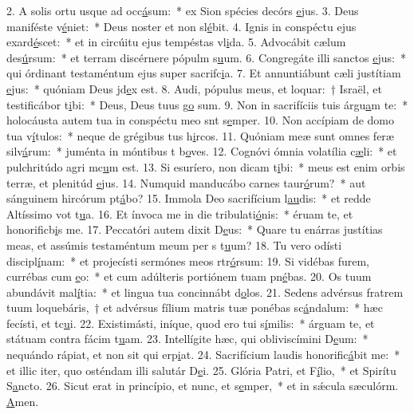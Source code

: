 2. A solis ortu usque ad occ\uline{á}sum:~* ex Sion spécies decórs \uline{e}jus.
3. Deus maniféste v\uline{é}niet:~* Deus noster et non sl\uline{é}bit.
4. Ignis in conspéctu ejus exard\uline{é}scet:~* et in circúitu ejus tempéstas vl\uline{i}da.
5. Advocábit cælum des\uline{ú}rsum:~* et terram discérnere pópulm s\uline{u}um.
6. Congregáte illi sanctos \uline{e}jus:~* qui órdinant testaméntum ejus super sacrifc\uline{i}a.
7. Et annuntiábunt cæli justítiam \uline{e}jus:~* quóniam Deus jd\uline{e}x est.
8. Audi, pópulus meus, et loquar:~† Israël, et testificábor t\uline{i}bi:~* Deus, Deus tuus g\uline{o} sum.
9. Non in sacrifíciis tuis árgu\uline{a}m te:~* holocáusta autem tua in conspéctu meo snt s\uline{e}mper.
10. Non accípiam de domo tua v\uline{í}tulos:~* neque de grégibus tus h\uline{i}rcos.
11. Quóniam meæ sunt omnes feræ silv\uline{á}rum:~* juménta in móntibus t b\uline{o}ves.
12. Cognóvi ómnia volatília c\uline{æ}li:~* et pulchritúdo agri mc\uline{u}m est.
13. Si esuríero, non dicam t\uline{i}bi:~* meus est enim orbis terræ, et plenitúd \uline{e}jus.
14. Numquid manducábo carnes taur\uline{ó}rum?~* aut sánguinem hircórum pt\uline{á}bo?
15. Immola Deo sacrifícium l\uline{au}dis:~* et redde Altíssimo vot t\uline{u}a.
16. Et ínvoca me in die tribulati\uline{ó}nis:~* éruam te, et honorificb\uline{i}s me.
17. Peccatóri autem dixit D\uline{e}us:~* Quare tu enárras justítias meas, et assúmis testaméntum meum per s t\uline{u}um?
18. Tu vero odísti discipl\uline{í}nam:~* et projecísti sermónes meos rtr\uline{ó}rsum:
19. Si vidébas furem, currébas cum \uline{e}o:~* et cum adúlteris portiónem tuam pn\uline{é}bas.
20. Os tuum abundávit mal\uline{í}tia:~* et lingua tua concinnábt d\uline{o}los.
21. Sedens advérsus fratrem tuum loquebáris,~† et advérsus fílium matris tuæ ponébas sc\uline{á}ndalum:~* hæc fecísti, et tc\uline{u}i.
22. Existimásti, iníque, quod ero tui s\uline{í}milis:~* árguam te, et státuam contra fácim t\uline{u}am.
23. Intellígite hæc, qui obliviscímini D\uline{e}um:~* nequándo rápiat, et non sit qui erp\uline{i}at.
24. Sacrifícium laudis honorific\uline{á}bit me:~* et illic iter, quo osténdam illi salutár D\uline{e}i.
25. Glória Patri, et F\uline{í}lio,~* et Spirítu S\uline{a}ncto.
26. Sicut erat in princípio, et nunc, et s\uline{e}mper,~* et in sǽcula sæculórm. \uline{A}men.
